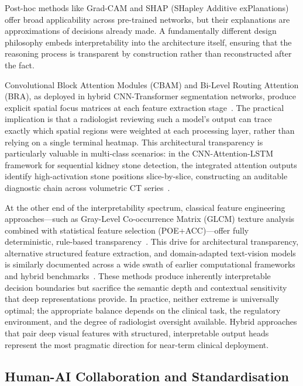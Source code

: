 \documentclass[pdflatex,sn-mathphys-num]{sn-jnl}%
\begin{document}
Post-hoc methods like Grad-CAM and SHAP (SHapley Additive exPlanations) offer broad applicability across pre-trained networks, but their explanations are approximations of decisions already made. A fundamentally different design philosophy embeds interpretability into the architecture itself, ensuring that the reasoning process is transparent by construction rather than reconstructed after the fact.

Convolutional Block Attention Modules (CBAM) and Bi-Level Routing Attention (BRA), as deployed in hybrid CNN-Transformer segmentation networks, produce explicit spatial focus matrices at each feature extraction stage~\cite{lan2024braunet}. The practical implication is that a radiologist reviewing such a model's output can trace exactly which spatial regions were weighted at each processing layer, rather than relying on a single terminal heatmap. This architectural transparency is particularly valuable in multi-class scenarios: in the CNN-Attention-LSTM framework for sequential kidney stone detection, the integrated attention outputs identify high-activation stone positions slice-by-slice, constructing an auditable diagnostic chain across volumetric CT series~\cite{alebada2026hybrid}.

At the other end of the interpretability spectrum, classical feature engineering approaches---such as Gray-Level Co-occurrence Matrix (GLCM) texture analysis combined with statistical feature selection (POE+ACC)---offer fully deterministic, rule-based transparency~\cite{farjad2021ct}. This drive for architectural transparency, alternative structured feature extraction, and domain-adapted text-vision models is similarly documented across a wide swath of earlier computational frameworks and hybrid benchmarks~\cite{hossain2024adaptive, elton2022deep, lee2020biobert, fang2023bioformer, luo2022biogpt, hatsutani2023protuberance, sharma2025hybrid, martin2025evaluation}. These methods produce inherently interpretable decision boundaries but sacrifice the semantic depth and contextual sensitivity that deep representations provide. In practice, neither extreme is universally optimal; the appropriate balance depends on the clinical task, the regulatory environment, and the degree of radiologist oversight available. Hybrid approaches that pair deep visual features with structured, interpretable output heads represent the most pragmatic direction for near-term clinical deployment.

\subsection{Human-AI Collaboration and Standardisation}
\label{subsec:human_ai}
\end{document}

